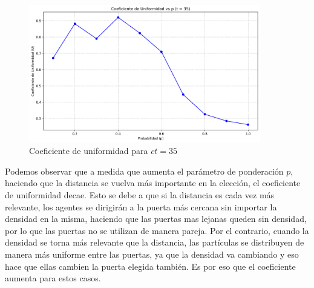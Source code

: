 \documentclass[12pt]{article}
\begin{document}
\begin{figure}[H]
    \centering
    \includegraphics[width=0.9\textwidth]{img/uniformity_vs_p_t35.png}
    \caption{Coeficiente de uniformidad para $ct=35$}
    \label{fig:flow_p100}
\end{figure}
Podemos observar que a medida que aumenta el parámetro de ponderación $p$, haciendo que la distancia se vuelva más importante en la elección, el coeficiente de uniformidad decae. Esto se debe a que si la distancia es cada vez más relevante, los agentes se dirigirán a la puerta más cercana sin importar la densidad en la misma, haciendo que las puertas mas lejanas queden sin densidad, por lo que las puertas no se utilizan de manera pareja. Por el contrario, cuando la densidad se torna más relevante que la distancia, las partículas se distribuyen de manera más uniforme entre las puertas, ya que la densidad va cambiando y eso hace que ellas cambien la puerta elegida también. Es por eso que el coeficiente aumenta para estos casos.
\end{document}
